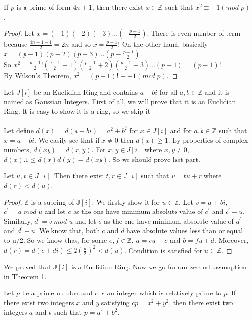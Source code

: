 \documentclass{article}
\begin{document}
\begin{lemma}
If $p$ is a prime of form $4n+1$, then there exist $x\in\mathbb{Z}$ such that $x^2\equiv-1(mod\;p)$.
\end{lemma}
\begin{proof}
Let $x=(-1)(-2)(-3)...(-\frac{p-1}{2})$. There is even number of term because $\frac{4n+1-1}{2}=2n$ and so $x=\frac{p-1}{2}!$
On the other hand, basically $x=(p-1)(p-2)(p-3)...(p-\frac{p-1}{2})$. \\ 
So $x^2=\frac{p-1}{2}!(\frac{p-1}{2}+1)(\frac{p-1}{2}+2)(\frac{p-1}{2}+3)...(p-1)=(p-1)!$.\\
By Wilson's Theorem, $x^2=(p-1)! \equiv -1(mod\;p)$.
\end{proof}

Let $J[i]$ be an Euclidian Ring and contains $a+bi$ for all $a,b\in\mathbb{Z}$ and it is named as Gaussian Integers.
First of all, we will prove that it is an Euclidian Ring. It is easy to show it is a ring, so we skip it.\\
\\
Let define $d(x)=d(a+bi)=a^2+b^2$ for $x\in J[i]$ and for $a,b\in\mathbb{Z}$ such that $x=a+bi$. We easily see that if $x\neq 0$ then $d(x)\geq 1$. By properties of complex numbers, $d(xy)=d(x,y)$. For $x,y\in J[i]$ where $x,y\neq 0$, $d(x).1\leq d(x)d(y)=d(xy)$. So we should prove last part.

\begin{lemma}
Let $u,v\in J[i]$. Then there exist $t,r\in J[i]$ such that $v=tu+r$ where $d(r)<d(u)$.
\end{lemma}

\begin{proof}
$\mathbb{Z}$ is a subring of $\mathbb{J}[i]$. We firstly show it for $u\in\mathbb{Z}.$ Let $v=a+bi$, $c^{'}=a\;mod\;u$ and let $c$ as the one have minimum absolute value of $c^{'}$ and $c^{'}-u$. Similarly, $d^{'}=b\;mod\;u$ and let $d$ as the one have minimum absolute value of $d^{'}$ and $d^{'}-u$. We know that, both $c$ and $d$ have absolute values less than or equal to {u/2}. So we know that, for some $e,f\in\mathbb{Z}$, $a=eu+c$ and $b=fu+d$. Moreover, $d(r)=d(c+di)\leq2(\frac{u}{2})^2<d(u)$. Condition is satisfied for $u\in\mathbb{Z}$.
\end{proof}

We proved that $\mathbb{J}[i]$ is a Euclidian Ring. Now we go for our second assumption in Theorem 1.

\begin{lemma}
Let $p$ be a prime number and $c$ is an integer which is relatively prime to $p$. If there exist two integers $x$ and $y$ satisfying $cp=x^2+y^2$, then there exist two integers $a$ and $b$ such that $p=a^2+b^2$.
\end{lemma}
\end{document}
